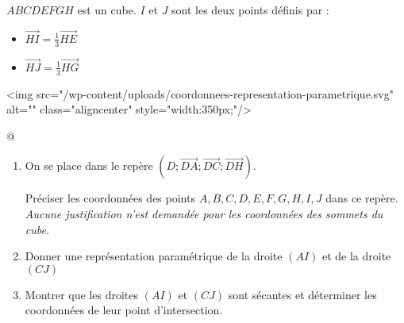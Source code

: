 
%
$ABCDEFGH$ est un cube. $I$ et $J$ sont les deux points définis par :
\begin{itemize}
     \item
     $\overrightarrow{HI}=\frac{1}{3}\overrightarrow{HE}$
     \item
     $\overrightarrow{HJ}=\frac{1}{3}\overrightarrow{HG}$
\end{itemize}
<img src="/wp-content/uploads/coordonnees-representation-parametrique.svg" alt="" class="aligncenter" style="width:350px;"/>

\begin{center}

\end{center}@
\begin{enumerate}
     \item
     On se place dans le repère $\left(D; \overrightarrow{DA}; \overrightarrow{DC}; \overrightarrow{DH}\right)$.
     \par
     Préciser les coordonnées des points $A, B, C, D, E, F, G, H, I, J$ dans ce repère.
     \textit{Aucune justification n'est demandée pour les coordonnées des sommets du cube.}
     \item
     Donner une représentation paramétrique de la droite $\left(AI\right)$ et de la droite $\left(CJ\right)$
     \item
     Montrer que les droites $\left(AI\right)$ et $\left(CJ\right)$ sont sécantes et déterminer les coordonnées de leur point d'intersection.
\end{enumerate}
